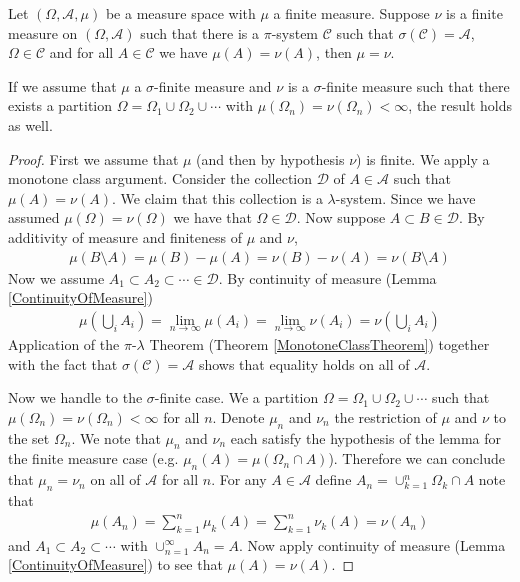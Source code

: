 \begin{lem}\label{UniquenessOfMeasure}Let $(\Omega, \mathcal{A}, \mu)$ be a measure space with
  $\mu$ a finite measure.  Suppose $\nu$ is a finite
  measure on
  $(\Omega, \mathcal{A})$ such that there is a $\pi$-system
  $\mathcal{C}$ such that $\sigma(\mathcal{C})=\mathcal{A}$, $\Omega \in \mathcal{C}$ and for all $A \in
  \mathcal{C}$ we have $\mu(A) = \nu(A)$, then $\mu=\nu$.

If we assume that $\mu$ a $\sigma$-finite measure and $\nu$ is a 
$\sigma$-finite measure such that there exists a partition $\Omega =
\Omega_1 \cup \Omega_2 \cup \cdots$ with $\mu(\Omega_n) =
\nu(\Omega_n) < \infty$, the result holds as well.
\end{lem}
\begin{proof}
First we assume that $\mu$ (and then by hypothesis $\nu$) is finite.
We apply a monotone class
argument.  Consider the collection $\mathcal{D}$ of $A \in
\mathcal{A}$ such that $\mu(A) = \nu(A)$.  We claim that
this collection is a $\lambda$-system.  Since we have assumed
$\mu(\Omega) = \nu(\Omega)$ we have that $\Omega \in \mathcal{D}$.  Now suppose $A
\subset B \in \mathcal{D}$.  By additivity of measure and finiteness
of $\mu$ and $\nu$,
\begin{align*}
\mu(B \setminus A) = \mu(B) - \mu(A) = \nu(B) -\nu(A) =
\nu(B \setminus A)
\end{align*}
Now we assume $A_1 \subset A_2 \subset \cdots \in \mathcal{D}$.  By
continuity of measure (Lemma \ref{ContinuityOfMeasure}) 
\begin{align*}
\mu \left ( \bigcup_i A_i \right ) = \lim_{n \to \infty} \mu(A_i) = \lim_{n \to \infty} \nu(A_i) =
\nu \left ( \bigcup_i A_i \right )
\end{align*}
Application of the $\pi$-$\lambda$ Theorem (Theorem
\ref{MonotoneClassTheorem}) together with the fact that
$\sigma(\mathcal{C}) = \mathcal{A}$ shows that equality holds on all
of $\mathcal{A}$.

Now we handle to the $\sigma$-finite case.  We a partition
$\Omega=\Omega_1 \cup \Omega_2 \cup \cdots$ such that $\mu(\Omega_n) =
\nu(\Omega_n) < \infty$ for all $n$.  Denote $\mu_n$ and
$\nu_n$ the restriction of $\mu$ and $\nu$ to the set $\Omega_n$.  We
note that $\mu_n$ and $\nu_n$ each satisfy the hypothesis of the lemma
for the finite measure case (e.g. $\mu_n(A) = \mu(\Omega_n \cap A)$).  Therefore
we can conclude that $\mu_n = \nu_n$ on all of $\mathcal{A}$ for all
$n$.  For any
$A \in \mathcal{A}$ define $A_n = \cup_{k=1}^n \Omega_k \cap A$ note
that 
\begin{align*}
\mu (A_n) = \sum_{k=1}^n \mu_k(A) = \sum_{k=1}^n \nu_k(A)  = \nu(A_n)
\end{align*}
and $A_1 \subset A_2 \subset \cdots $ with $\cup_{n=1}^\infty A_n =
A$.  Now apply continuity of measure (Lemma \ref{ContinuityOfMeasure}) to see that $\mu(A)=\nu(A)$.
\end{proof}

